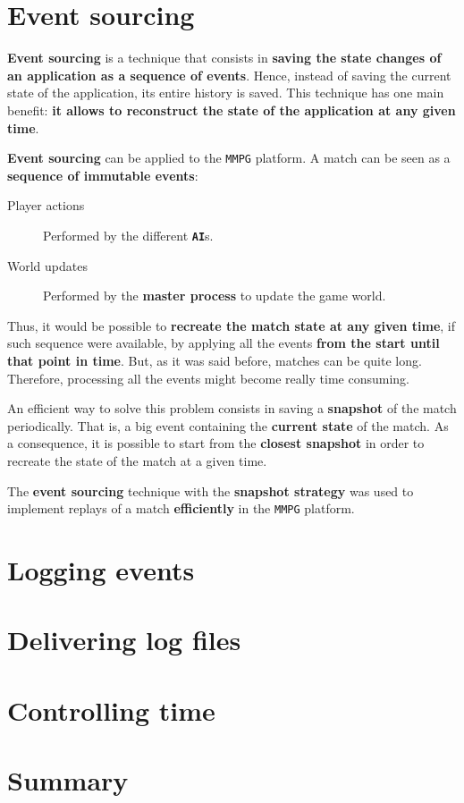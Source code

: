 \documentclass[a4paper,11pt,titlepage,abstract,numbers=noenddot,automark,mnsy,intlimits,rgb,dvipsnames]{report}
\begin{document}
\section{Event sourcing}
\textbf{Event sourcing} \cite{event_sourcing} is a technique that consists in \textbf{saving the state changes of an application as a
sequence of events}. Hence, instead of saving the current state of the application, its entire history is saved. This technique
has one main benefit: \textbf{it allows to reconstruct the state of the application at any given time}.

\textbf{Event sourcing} can be applied to the \texttt{MMPG} platform. A match can be seen as a \textbf{sequence of immutable events}:
\begin{description}
\item[Player actions]
Performed by the different \textbf{\texttt{AI}}s.
\item[World updates]
Performed by the \textbf{master process} to update the game world.
\end{description}
Thus, it would be possible to \textbf{recreate the match state at any given time}, if such sequence were available, by applying
all the events \textbf{from the start until that point in time}. But, as it was said before, matches can be quite long. Therefore,
processing all the events might become really time consuming.

An efficient way to solve this problem consists in saving a \textbf{snapshot} of the match periodically. That is, a big event
containing the \textbf{current state} of the match. As a consequence, it is possible to start from the \textbf{closest snapshot} in order
to recreate the state of the match at a given time.

The \textbf{event sourcing} technique with the \textbf{snapshot strategy} was used to implement replays of a match \textbf{efficiently} in
the \texttt{MMPG} platform.
\section{Logging events}
\section{Delivering log files}
\section{Controlling time}
\section{Summary}
\end{document}
